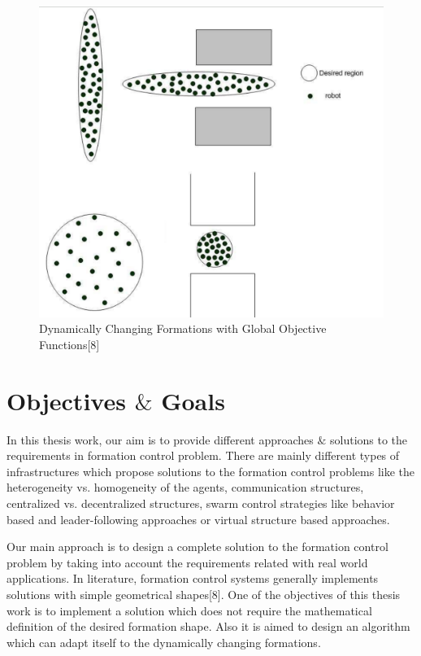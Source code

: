 \begin{figure}[H]
\caption{Dynamically Changing Formations with Global Objective Functions[8]}
\centering
\includegraphics[scale = 0.35]{houslotine}
\end{figure}


\section{Objectives $\&$ Goals} \label{Objectives}
In this thesis work, our aim is to provide different approaches $\&$ solutions to the requirements in formation control problem.  There are mainly different types of  infrastructures which propose solutions to the formation control problems like the heterogeneity vs. homogeneity of the agents, communication structures, centralized vs. decentralized structures, swarm control strategies like behavior based and leader-following approaches or virtual structure based approaches. 

Our main approach is to design a complete solution to the formation control problem by taking into account the requirements related with real world applications. In literature, formation control systems generally implements solutions with simple geometrical shapes[8]. One of the objectives of this thesis work is to implement a solution which does not require the mathematical definition of the desired formation shape. Also it is aimed to design an algorithm which can adapt itself to the dynamically changing formations.

